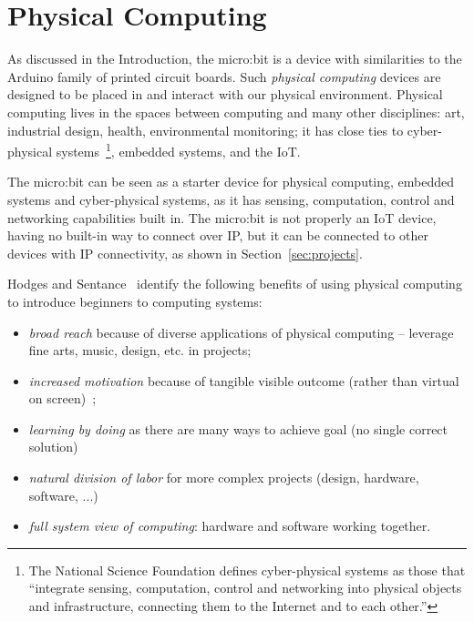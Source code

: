 \section{Physical Computing}
\label{sec:physical}


As discussed in the Introduction, the micro:bit is a device
with similarities to the Arduino family of printed 
circuit boards. Such {\em physical computing} devices
are designed to be placed in and interact with our physical environment. 
Physical computing lives in the spaces between computing and many other disciplines:
art, industrial design, health, environmental monitoring; it has
close ties to cyber-physical systems~\footnote{
    The National Science Foundation
    defines cyber-physical systems as those that ``integrate sensing, computation, 
    control and networking into physical objects and infrastructure, 
    connecting them to the Internet and to each other.''\cite{NSF}}, embedded systems, and the IoT. 


The micro:bit can be seen as a starter device
for physical computing, embedded systems and cyber-physical systems, as it has
sensing, computation, control and networking capabilities built in.  The
micro:bit is not properly an IoT device, having no built-in way to connect
over IP, but it can be connected to other devices with IP connectivity, as
shown in Section~\ref{sec:projects}.


Hodges and Sentance~\cite{IEEEComputer} identify 
the following benefits of using physical computing to introduce beginners to computing systems:
\begin{itemize}
\item {\em broad reach} because of diverse applications of physical computing -- leverage fine arts, music, design, etc. in projects;
\item {\em increased motivation} because of tangible visible outcome (rather than virtual on screen)~\cite{Papert};
\item {\em learning by doing} as there are many ways to achieve goal (no single correct solution)~\cite{BenAri}
\item {\em natural division of labor} for more complex projects (design, hardware, software, ...)
\item {\em full system view of computing}: hardware and software working together.
\end{itemize}

